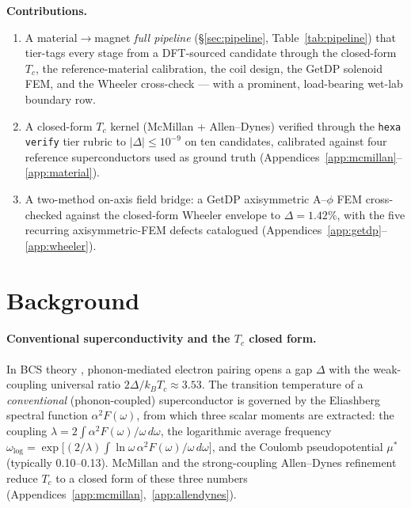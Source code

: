 \documentclass[11pt,a4paper]{article}
\begin{document}
\medskip
\noindent\textbf{Contributions.}
\begin{enumerate}\itemsep0.3em
\item A material$\to$magnet \emph{full pipeline}
  (\S\ref{sec:pipeline}, Table~\ref{tab:pipeline}) that tier-tags every
  stage from a DFT-sourced candidate through the closed-form $T_c$, the
  reference-material calibration, the coil design, the GetDP solenoid
  FEM, and the Wheeler cross-check --- with a prominent, load-bearing
  wet-lab boundary row.
\item A closed-form $T_c$ kernel (McMillan + Allen--Dynes) verified
  through the \texttt{hexa verify} tier rubric to $|\Delta|\!\le\!10^{-9}$
  on ten candidates, calibrated against four reference superconductors
  used as ground truth (Appendices~\ref{app:mcmillan}--\ref{app:material}).
\item A two-method on-axis field bridge: a GetDP axisymmetric A--$\phi$
  FEM cross-checked against the closed-form Wheeler envelope to
  $\Delta\!=\!1.42\%$, with the five recurring axisymmetric-FEM defects
  catalogued (Appendices~\ref{app:getdp}--\ref{app:wheeler}).
\end{enumerate}

\section{Background}
\label{sec:bg}

\paragraph{Conventional superconductivity and the $T_c$ closed form.}
In BCS theory \citep{bcs1957}, phonon-mediated electron pairing opens a
gap $\Delta$ with the weak-coupling universal ratio
$2\Delta/k_BT_c\!\approx\!3.53$. The transition temperature of a
\emph{conventional} (phonon-coupled) superconductor is governed by the
Eliashberg spectral function $\alpha^2F(\omega)$, from which three
scalar moments are extracted: the coupling
$\lambda\!=\!2\!\int\!\alpha^2F(\omega)/\omega\,d\omega$, the
logarithmic average frequency
$\omega_{\log}\!=\!\exp\!\big[(2/\lambda)\!\int\!\ln\omega\,\alpha^2F(\omega)/\omega\,d\omega\big]$,
and the Coulomb pseudopotential $\mu^{*}$ (typically 0.10--0.13).
McMillan \citep{mcmillan1968} and the strong-coupling Allen--Dynes
\citep{allendynes1975} refinement reduce $T_c$ to a closed form of
these three numbers (Appendices~\ref{app:mcmillan},~\ref{app:allendynes}).
\end{document}

